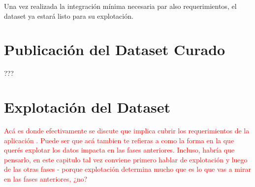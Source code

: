 Una vez realizada la integración mínima necesaria par also requerimientos, el dataset ya estará listo para su explotación.

\section{Publicación del Dataset Curado}
???

\section{Explotación del Dataset}
\begin{framed}
\textcolor{red}{Acá es donde efectivamente se discute que implica cubrir los requerimientos de la aplicación . Puede ser que acá tambien te refieras a como la forma en la que querés explotar los datos impacta en las fases anteriores. Incluso, habría que pensarlo, en este capitulo tal vez conviene primero hablar de explotación y luego de las otras fases - porque explotación determina mucho que es lo que vas a mirar en las fases anteriores, ¿no?}
\end{framed}

